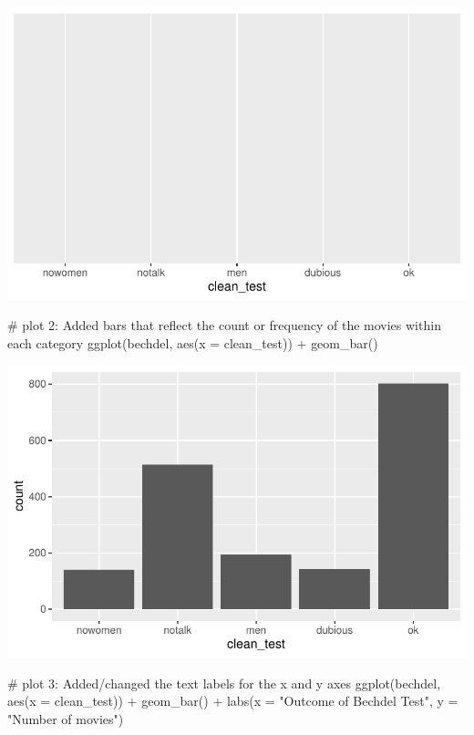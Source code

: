 \documentclass[
  letterpaper,
  DIV=11,
  numbers=noendperiod]{scrreprt}
\newenvironment{Shaded}{\begin{snugshade}}{\end{snugshade}}
\newcommand{\AttributeTok}[1]{\textcolor[rgb]{0.40,0.45,0.13}{#1}}
\newcommand{\CommentTok}[1]{\textcolor[rgb]{0.37,0.37,0.37}{#1}}
\newcommand{\FunctionTok}[1]{\textcolor[rgb]{0.28,0.35,0.67}{#1}}
\newcommand{\NormalTok}[1]{\textcolor[rgb]{0.00,0.23,0.31}{#1}}
\newcommand{\SpecialCharTok}[1]{\textcolor[rgb]{0.37,0.37,0.37}{#1}}
\newcommand{\StringTok}[1]{\textcolor[rgb]{0.13,0.47,0.30}{#1}}
\begin{document}
\includegraphics{src/02-Intro_Data_Viz_files/figure-pdf/unnamed-chunk-19-1.pdf}

\begin{Shaded}
\begin{Highlighting}[]

\CommentTok{\# plot 2: Added bars that reflect the count or frequency of the movies within each category}
\FunctionTok{ggplot}\NormalTok{(bechdel, }\FunctionTok{aes}\NormalTok{(}\AttributeTok{x =}\NormalTok{ clean\_test)) }\SpecialCharTok{+}
\FunctionTok{geom\_bar}\NormalTok{()}
\end{Highlighting}
\end{Shaded}

\includegraphics{src/02-Intro_Data_Viz_files/figure-pdf/unnamed-chunk-19-2.pdf}

\begin{Shaded}
\begin{Highlighting}[]

\CommentTok{\# plot 3: Added/changed the text labels for the x and y axes}
\FunctionTok{ggplot}\NormalTok{(bechdel, }\FunctionTok{aes}\NormalTok{(}\AttributeTok{x =}\NormalTok{ clean\_test)) }\SpecialCharTok{+}
\FunctionTok{geom\_bar}\NormalTok{() }\SpecialCharTok{+}
\FunctionTok{labs}\NormalTok{(}\AttributeTok{x =} \StringTok{"Outcome of Bechdel Test"}\NormalTok{, }\AttributeTok{y =} \StringTok{"Number of movies"}\NormalTok{)}
\end{Highlighting}
\end{Shaded}
\end{document}
